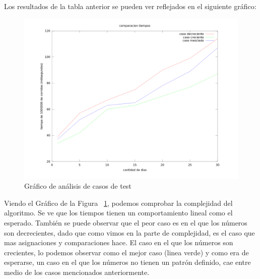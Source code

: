 \indent Los resultados de la tabla anterior se pueden ver reflejados en el siguiente gráfico:

\begin{figure}[h]
\centering                                                       
        \includegraphics[width=340pt]{./figs/p1Tiempos.png}
	\caption{Gráfico de análisis de casos de test}
	\label{fig:p1tiempos}
\end{figure}


\indent Viendo el Gráfico de la Figura ~\ref{fig:p1tiempos}, podemos comprobar la complejidad del algoritmo. Se ve que los tiempos tienen un comportamiento lineal como el esperado. También se puede observar que el peor caso es en el que los números son decrecientes, dado que como vimos en la parte de complejidad, es el caso que mas asignaciones y comparaciones hace. El caso en el que los números son crecientes, lo podemos observar como el mejor caso (linea verde) y como era de esperarse, un caso en el que los números no tienen un patrón definido, cae entre medio de los casos mencionados anteriormente. \\


